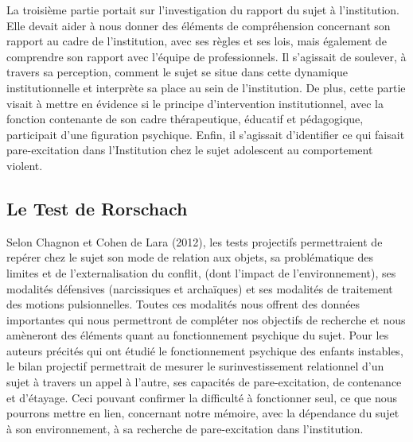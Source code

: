 \documentclass[12pt, a4paper]{book}
\begin{document}
\begin{spacing}{1.5}
La troisième partie portait sur l'investigation du  rapport du sujet à l'institution. Elle devait aider à nous donner des éléments de compréhension concernant son rapport au cadre de l'institution, avec ses règles et ses lois, mais également de comprendre son rapport avec l'équipe de professionnels. Il s'agissait de soulever, à travers sa perception, comment le sujet se situe dans cette dynamique institutionnelle et interprète sa place au sein de l'institution. De plus, cette partie visait à mettre en évidence si le principe d'intervention institutionnel, avec la fonction contenante de son cadre thérapeutique, éducatif et pédagogique, participait d'une figuration psychique.   Enfin, il s'agissait d'identifier ce qui faisait pare-excitation dans l'Institution chez le sujet adolescent au comportement violent.  

\subsection{Le Test de Rorschach}

Selon Chagnon et Cohen de Lara (2012), les tests projectifs permettraient de repérer chez le sujet son mode de relation aux objets, sa problématique des limites et de l'externalisation du conflit, (dont l'impact de l'environnement), ses modalités défensives (narcissiques et archaïques) et ses modalités de traitement des motions pulsionnelles. Toutes ces modalités nous offrent des données importantes qui nous permettront de compléter nos objectifs de recherche et nous amèneront des éléments quant au fonctionnement psychique du sujet.  Pour les auteurs précités qui ont étudié le fonctionnement psychique des enfants instables, le bilan projectif permettrait de mesurer le surinvestissement relationnel d'un sujet à travers un appel à l'autre, ses capacités de pare-excitation, de contenance et d'étayage. Ceci pouvant confirmer la difficulté à fonctionner seul, ce que nous pourrons mettre en lien, concernant notre mémoire, avec la dépendance du sujet à son environnement, à sa recherche de pare-excitation dans l'institution.


\end{spacing}
\end{document}
